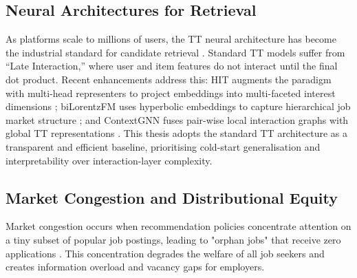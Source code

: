 \subsection{Neural Architectures for Retrieval}
As platforms scale to millions of users, the \gls{TT} neural
architecture has become the industrial standard for candidate retrieval
\cite{Xiong_2025, yuan2024contextgnntwotowerrecommendationsystems}.
Standard \gls{TT} models suffer from ``Late Interaction,'' where user
and item features do not interact until the final dot product. Recent
enhancements address this: HIT augments the paradigm with multi-head
representers to project embeddings into multi-faceted interest
dimensions \cite{yang2025hitmodelhierarchicalinteractionenhanced};
biLorentzFM uses hyperbolic embeddings to capture hierarchical job
market structure \cite{biLorentzFM2025}; and ContextGNN fuses
pair-wise local interaction graphs with global \gls{TT} representations
\cite{yuan2024contextgnntwotowerrecommendationsystems}. This thesis
adopts the standard \gls{TT} architecture as a transparent and
efficient baseline, prioritising cold-start generalisation and
interpretability over interaction-layer complexity.

\subsection{Market Congestion and Distributional Equity}
Market congestion occurs when recommendation policies concentrate attention on a tiny subset of popular job postings, leading to "orphan jobs" that receive zero applications \cite{01KAK08E4756SJAF6RCBJVGWXB, mashayekhi2023challengebasedsurveyerecruitmentrecommendation}. This concentration degrades the welfare of all job seekers and creates information overload and vacancy gaps for employers.


